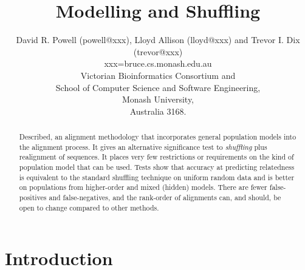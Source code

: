 \documentclass[letterpaper,11pt,oneside]{article}
\begin{document}
\title{Modelling and Shuffling}

\author{
  David R. Powell (powell@xxx), Lloyd Allison (lloyd@xxx) and Trevor I. Dix (trevor@xxx)\\
{\small xxx=bruce.cs.monash.edu.au} \\
  Victorian Bioinformatics Consortium and \\
  School of Computer Science and Software Engineering, \\
  Monash University, \\
  Australia 3168.
}

\date{}
\maketitle



\begin{abstract}
Described, an alignment methodology that incorporates general
population models into the alignment process.
It gives an alternative significance test to {\em shuffling} plus realignment
of sequences.
It places very few restrictions or requirements on the kind of
population model that can be used.
Tests show that accuracy at predicting relatedness is equivalent to
the standard shuffling technique on uniform random data and
is better on populations from higher-order and mixed (hidden) models.
There are fewer false-positives and false-negatives, and
the rank-order of alignments can, and should, be open to change
compared to other methods. 
\end{abstract}

\section{Introduction}
\label{sec:intro}
\end{document}
